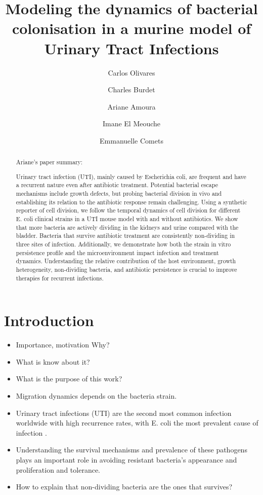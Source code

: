 \documentclass{article}
\title{Modeling the dynamics of bacterial colonisation in a murine model of Urinary Tract Infections}
\author[1]{Carlos Olivares}
\author[1]{Charles Burdet}
\author[1]{Ariane Amoura}
\author[1]{Imane El Meouche}
\author[1,2]{Emmanuelle Comets}
\affil[1]{Universit\'e Paris Cit\'e and Universit\'e Sorbonne Paris Nord, Inserm, IAME, F-75018 Paris, France}
\affil[2]{Univ Rennes, Inserm, EHESP, Irset - UMRS 1085, 35000 Rennes, France}
\begin{document}
\maketitle

\begin{abstract}
	
Ariane's paper summary:

Urinary tract infection (UTI), mainly caused by Escherichia coli, are frequent and have a recurrent nature even
after antibiotic treatment. Potential bacterial escape mechanisms include growth defects, but probing bacterial division in vivo and establishing its relation to the antibiotic response remain challenging. Using a synthetic reporter of cell division, we follow the temporal dynamics of cell division for different E. coli clinical
strains in a UTI mouse model with and without antibiotics. We show that more bacteria are actively dividing in the kidneys and urine compared with the bladder. Bacteria that survive antibiotic treatment are consistently non-dividing in three sites of infection. 
Additionally, we demonstrate how both the strain in vitro persistence profile and the microenvironment impact infection and treatment dynamics. Understanding the relative
contribution of the host environment, growth heterogeneity, non-dividing bacteria, and antibiotic persistence is crucial to improve therapies for recurrent infections.
\end{abstract}

\section{Introduction}



\begin{itemize}
	\item Importance, motivation Why?
	\item What is know about it?
	\item What is the purpose of this work?
	\item Migration dynamics depends on the bacteria strain.
	\item Urinary tract infections (UTI) are the second most common infection worldwide with high recurrence rates, with E. coli the most prevalent cause of infection \cite{rosen2007detection}.
	\item Understanding the survival mechanisms and prevalence of these pathogens plays an important role in avoiding resistant bacteria's appearance and proliferation and tolerance.
	\item How to explain that non-dividing bacteria are the ones that survives?
\end{itemize}
\end{document}
